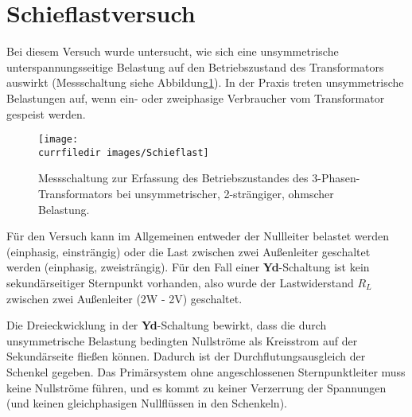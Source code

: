 \section{Schieflastversuch}
Bei diesem Versuch wurde untersucht, wie sich eine unsymmetrische unterspannungsseitige Belastung auf den Betriebszustand des Transformators auswirkt (Messschaltung siehe Abbildung\;\ref{fig:Schieflast_Messschaltung}). In der Praxis treten unsymmetrische Belastungen auf, wenn ein- oder zweiphasige Verbraucher vom Transformator gespeist werden. 
\begin{figure}[ht]
    \centering
    \texttt{[image: \\currfiledir images/Schieflast]}
    \caption{Messschaltung zur Erfassung des Betriebszustandes des 3-Phasen-Transformators bei unsymmetrischer, 2-strängiger, ohmscher Belastung.}
    \label{fig:Schieflast_Messschaltung}
\end{figure}
\noindent
Für den Versuch kann im Allgemeinen entweder der Nullleiter belastet werden (einphasig, einsträngig) oder die Last zwischen zwei Außenleiter geschaltet werden (einphasig, zweisträngig). Für den Fall einer \textbf{Yd}-Schaltung ist kein sekundärseitiger Sternpunkt vorhanden, also wurde der Lastwiderstand $R_L$ zwischen zwei Außenleiter (2W - 2V) geschaltet. 

Die Dreieckwicklung in der \textbf{Yd}-Schaltung bewirkt, dass die durch unsymmetrische Belastung bedingten Nullströme als Kreisstrom auf der Sekundärseite fließen können. Dadurch ist der Durchflutungsausgleich der Schenkel gegeben. Das Primärsystem ohne angeschlossenen Sternpunktleiter muss keine Nullströme führen, und es kommt zu keiner Verzerrung der Spannungen (und keinen gleichphasigen Nullflüssen in den Schenkeln).

